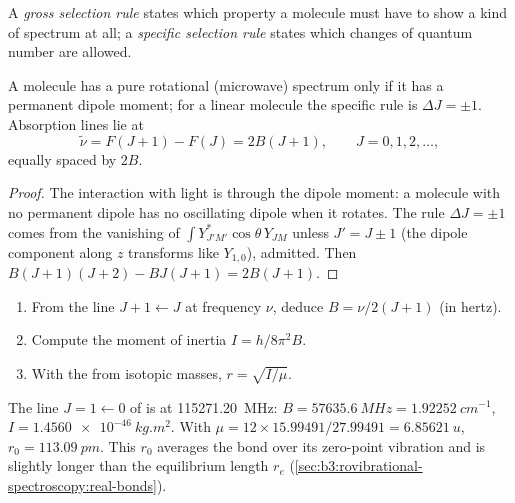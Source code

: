 \begin{definition}\label{def:b3:rovibrational-spectroscopy:selection}
A \emph{gross selection rule} states which
property a molecule must have to show a kind of spectrum at all; a
\emph{specific selection rule} states which
changes of quantum number are allowed.
\end{definition}

\begin{proposition}\label{prop:b3:rovibrational-spectroscopy:rotational-lines}
A molecule has a pure rotational (microwave) spectrum only if it has a
permanent dipole moment; for a linear molecule the specific rule is $\Delta J
= \pm1$. Absorption lines lie at
\[
\tilde\nu = F(J+1) - F(J) = 2B(J + 1), \qquad J = 0, 1, 2, \dots,
\]
equally spaced by $2B$.
\end{proposition}

\begin{proof}
The interaction with light is through the dipole moment: a molecule with no
permanent dipole has no oscillating dipole when it rotates. The rule $\Delta J
= \pm1$ comes from the vanishing of $\int Y_{J'M'}^*\cos\theta\,Y_{JM}$ unless $J' = J
\pm 1$ (the dipole component along $z$ transforms like $Y_{1,0}$), admitted.
Then $B(J+1)(J+2) - BJ(J+1) = 2B(J+1)$.
\end{proof}

\begin{method}\label{met:b3:rovibrational-spectroscopy:bond-length}
\begin{enumerate}
  \item From the line $J + 1 \leftarrow J$ at frequency $\nu$, deduce $B =
        \nu/2(J+1)$ (in hertz).
  \item Compute the moment of inertia $I = h/8\pi^2B$.
  \item With the  from isotopic masses, $r = \sqrt{I/\mu}$.
\end{enumerate}
\end{method}

\begin{example}\label{ex:b3:rovibrational-spectroscopy:co}
The line $J = 1 \leftarrow 0$ of  is at \qty{115271.20}{MHz}:
$B = \qty{57635.6}{MHz} = \qty{1.92252}{cm^{-1}}$, $I = \qty{1.4560e-46}{kg.m^2}$.
With $\mu = 12 \times 15.99491/27.99491 = \qty{6.85621}{u}$, $r_0 = \qty{113.09}{pm}$.
This $r_0$ averages the bond over its zero-point vibration and is slightly
longer than the equilibrium length $r_e$ (\cref{sec:b3:rovibrational-spectroscopy:real-bonds}).
\end{example}

